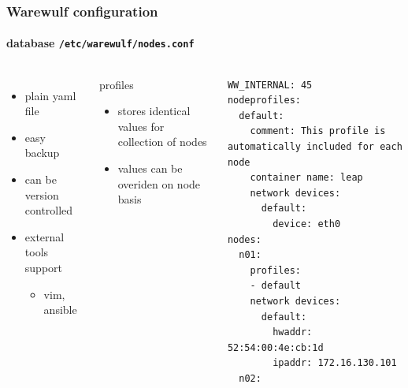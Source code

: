 \documentclass[aspectratio=169]{beamer}
\begin{document}
\begin{frame}[fragile]
\frametitle{Warewulf configuration}
\framesubtitle{database \texttt{/etc/warewulf/nodes.conf}}
\begin{columns}
\begin{itemize}
  \item plain yaml file
  \item easy backup
  \item can be version controlled
  \item external tools support
  \begin{itemize}
    \item vim, ansible
  \end{itemize}
\end{itemize}
\begin{block}{profiles}
\begin{itemize}
  \item stores identical values for collection of nodes
  \item values can be overiden on node basis
\end{itemize}
\end{block}
\begin{lstlisting}[style=yaml]
WW_INTERNAL: 45
nodeprofiles:
  default:
    comment: This profile is automatically included for each node
    container name: leap
    network devices:
      default:
        device: eth0
nodes:
  n01:
    profiles:
    - default
    network devices:
      default:
        hwaddr: 52:54:00:4e:cb:1d
        ipaddr: 172.16.130.101
  n02:
\end{lstlisting}
%
\end{columns}
\end{frame}
\end{document}
